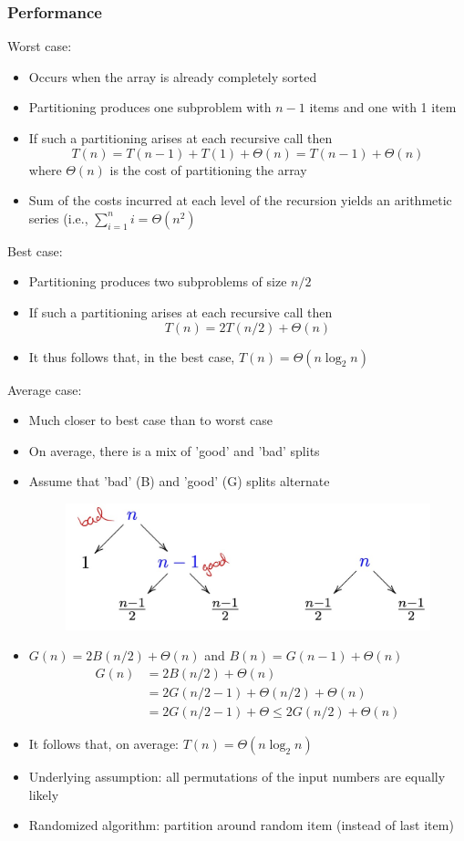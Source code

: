 \subsubsection{Performance}
Worst case:
\begin{itemize}
    \item Occurs when the array is already completely sorted
    \item Partitioning produces one subproblem with $n-1$ items and one with 1 item
    \item If such a partitioning arises at each recursive call then \[
    T(n)=T(n-1)+T(1) + \Theta(n) =T(n-1)+\Theta(n)
    \] where $\Theta(n)$ is the cost of partitioning the array
    \item Sum of the costs incurred at each level of the recursion yields an arithmetic series (i.e., $\sum_{i=1}^n i = \Theta(n^2)$
\end{itemize}
Best case:
\begin{itemize}
    \item Partitioning produces two subproblems of size $n/2$
    \item If such a partitioning arises at each recursive call then \[
    T(n)=2T(n/2)+\Theta(n)
    \]
    \item It thus follows that, in the best case, $T(n)=\Theta(n \log_2 n)$
\end{itemize}
Average case:
\begin{itemize}
    \item Much closer to best case than to worst case
    \item On average, there is a mix of 'good' and 'bad' splits
    \item Assume that 'bad' (B) and 'good' (G) splits alternate
    \begin{figure}[H]
        \centering
        \includegraphics[width=0.5\linewidth]{images/Screenshot 2024-05-30 at 18.21.54.jpg}
    \end{figure}
    \item $G(n)=2B(n/2)+\Theta(n)$ and $B(n)=G(n-1)+\Theta(n)$
     \begin{align*}
        G(n)&=2B(n/2)+\Theta(n)\\
        &=2G(n/2-1)+\Theta(n/2)+\Theta(n)\\
        &=2G(n/2-1)+\Theta \leq 2G(n/2)+\Theta(n)
    \end{align*}
    \item It follows that, on average: $T(n)=\Theta(n \log_2 n)$
    \item Underlying assumption: all permutations of the input numbers are equally likely
    \item Randomized algorithm: partition around random item (instead of last item) 
\end{itemize}



